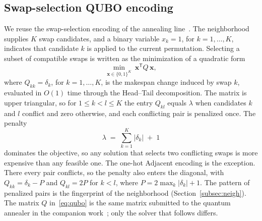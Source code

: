 \documentclass{svproc}
\begin{document}
\subsection{Swap-selection QUBO encoding}
\label{subsec:qubo}
We reuse the swap-selection encoding of the annealing
line~\cite{wojewodzki2026bpasts}. The neighborhood supplies $K$ swap
candidates, and a binary variable $x_k=1$, for $k=1,\dots,K$, indicates
that candidate $k$ is applied to the current permutation. Selecting
a subset of compatible swaps is written as the minimization of a
quadratic form
\begin{equation}
  \min_{\mathbf{x}\in\{0,1\}^{K}}\
  \mathbf{x}^{\mathsf T} Q\,\mathbf{x},
  \label{eq:qubo}
\end{equation}
where $Q_{kk}=\delta_k$, for $k=1,\dots,K$, is the makespan change induced
by swap $k$, evaluated in $O(1)$ time through the Head--Tail decomposition.
The matrix is upper triangular, so for $1\le k<l\le K$ the entry $Q_{kl}$
equals $\lambda$ when candidates $k$ and $l$ conflict and zero otherwise, and
each conflicting pair is penalized once. The penalty
\begin{equation}
  \lambda \;=\; \sum_{k=1}^{K}\lvert\delta_k\rvert \;+\; 1
  \label{eq:penalty}
\end{equation}
dominates the objective, so any solution that selects two conflicting
swaps is more expensive than any feasible one. The one-hot Adjacent encoding
is the exception. There every pair conflicts, so the penalty also enters the
diagonal, with $Q_{kk}=\delta_k-P$ and $Q_{kl}=2P$ for $k<l$, where
$P=2\max_{k}\lvert\delta_k\rvert+1$. The pattern of penalized
pairs is the fingerprint of the neighborhood
(Section~\ref{subsec:neigh}). The matrix $Q$ in~\eqref{eq:qubo} is the
same matrix submitted to the quantum annealer in the companion
work~\cite{wojewodzki2026windowed}; only the solver that follows differs.
\end{document}
